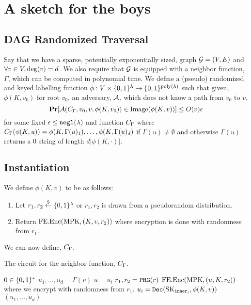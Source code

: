 \section{A sketch for the boys}
\newcommand{\labelFunc}{\phi}
\newcommand{\imageFn}{\text{Image}}
\newcommand{\pathSuffix}{\text{Suff}}

\subsection{DAG Randomized Traversal}
Say that we have a sparse, potentially exponentially sized, graph $\mathcal{G} = (V, E)$
and $\forall v \in V, \deg(v) = d$.
We also require that $\mathcal{G}$ is equipped with a neighbor function, $\Gamma$, which can be computed in polynomial time.
We define a (pseudo) randomized and keyed labelling function $\phi: V \times \{0,1\}^\lambda \rightarrow \{0,1\}^{\operatorname{poly}(\lambda)}$ 
such that given, $\phi(K, v_0)$ for root $v_0$, an adversary, $\mathcal{A}$, which does not know a path from $v_0$ to $v$,
\begin{equation}
	\label{eq:guessPhi}
	\Pr[\advers(\circNeigb, v_0, v, \labelFunc(K, v_0)) \in \imageFn(\labelFunc(K, v))] \leq O(v)\eps
\end{equation}
for some fixed $\epsilon \leq \texttt{negl}(\lambda)$ and function $C_\Gamma$ where $\circNeigb(\labelFunc(K, u)) = \labelFunc(K, \Gamma(u)_1), \dots, \labelFunc(K, \Gamma(u)_d)$
if $\Gamma(u) \neq \emptyset$ and otherwise $\Gamma(u)$ returns a $0$ string of length $d |\labelFunc(K, \cdot)|$.

\subsection{Instantiation}
We define $\labelFunc(K, v)$ to be as follows:
\begin{enumerate}
	\item Let $r_1, r_2 \overset{\$}{\gets} \{0,1\}^\lambda$ or $r_1, r_2$ is drawn from a pseudorandom distribution. %
	\item Return $\text{FE.Enc}(\text{MPK}, (K, v, r_2))$ where encryption is done with randomness from $r_1$.
\end{enumerate}

We can now define, $C_\Gamma$.
\begin{algorithm}[H]
	\caption{
		The circuit for the neighbor function, $C_\Gamma$.
	}
	\begin{algorithmic}[1]
				\State \Return $0 \in \{0,1\}^*$ %
			\EndIf
			\State $u_1, \dots, u_d = \Gamma(v)$
			\State $u = u_i$
			\State $r_1, r_2 = \texttt{PRG}(r)$
			\label{alg:neighb:prg}
			\State \Return $\text{FE.Enc}(\text{MPK}, (u, K, r_2))$ where we encrypt with randomness from $r_1$.
		\EndFunction
				\State $u_i = \texttt{Dec}(\text{SK}_{\texttt{inner}_i}, \phi(K, v))$
			\EndFor
			\State \Return $(u_1, \dots, u_d)$
		\EndFunction
	\end{algorithmic}
	\label{alg:neighb}
\end{algorithm}

